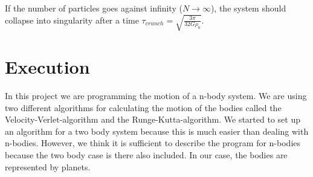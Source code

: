 \documentclass[10pt,a4paper]{article}
\begin{document}
If the number of particles goes against infinity ($N \to \infty$), the system should collapse into singularity after a time $\tau_{crunch} = \sqrt{\frac{3\pi}{32 G \rho_0}}$. 


\section{Execution}

In this project we are programming the motion of a n-body system. We are using two different algorithms for calculating the motion of the bodies called the Velocity-Verlet-algorithm and the Runge-Kutta-algorithm. 
We started to set up an algorithm for a two body system because this is much easier than dealing with n-bodies. However, we think it is sufficient to describe the program for n-bodies because the two body case is there also included. In our case, the bodies are represented by planets. 
\end{document}
